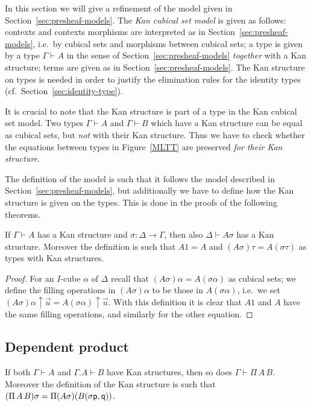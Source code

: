 \documentclass[10pt,a4paper]{article}
\newcommand{\pp}{{\sf p}}
\newcommand{\qq}{{\sf q}}
\newcommand{\rup}[1]{#1{\uparrow}}
\begin{document}
In this section we will give a refinement of the model given in
Section~\ref{sec:presheaf-models}.  The \emph{Kan cubical set model}
is given as follows: contexts and contexts morphisms are interpreted
as in Section~\ref{sec:presheaf-models}, i.e.\ by cubical sets and
morphisms between cubical sets; a type is given by a type $\Gamma
\vdash A$ in the sense of Section~\ref{sec:presheaf-models}
\emph{together} with a Kan structure; terms are given as in
Section~\ref{sec:presheaf-models}. The Kan structure on types is
needed in order to justify the elimination rules for the identity
types (cf.\ Section~\ref{sec:identity-type}).

It is crucial to note that the Kan structure is part of a type in the
Kan cubical set model.  Two types $\Gamma \vdash A$ and $\Gamma \vdash
B$ which have a Kan structure can be equal as cubical sets, but
\emph{not} with their Kan structure.  Thus we have to check whether
the equations between types in Figure~\ref{MLTT} are preserved
\emph{for their Kan structure}.

The definition of the model is such that it follows the model
described in Section~\ref{sec:presheaf-models}, but additionally we
have to define how the Kan structure is given on the types.  This is
done in the proofs of the following theorems.

\begin{theorem}
  If $\Gamma \vdash A$ has a Kan structure and $\sigma \colon \Delta
  \to \Gamma$, then also $\Delta \vdash A \sigma$ has a Kan structure.
  Moreover the definition is such that $A 1 = A$ and $(A \sigma) \tau
  = A (\sigma \tau)$ as types with Kan structures.
\end{theorem}
\begin{proof}
  For an $I$-cube $\alpha$ of $\Delta$ recall that $(A \sigma) \alpha
  = A (\sigma \alpha)$ as cubical sets; we define the filling
  operations in $(A \sigma) \alpha$ to be those in $A (\sigma
  \alpha)$, i.e.\ we set $\rup{(A \sigma) \alpha} {\vec u} = \rup {A
    (\sigma \alpha)} {\vec u}$.  With this definition it is clear that
  $A 1$ and $A$ have the same filling operations, and similarly for
  the other equation.
\end{proof}

\subsection{Dependent product}

\begin{theorem}
  If both $\Gamma\vdash A$ and $\Gamma.A\vdash B$ have Kan structures,
  then so does $\Gamma\vdash\Pi\,A\,B$.  Moreover the definition of
  the Kan structure is such that $(\Pi\,A\,B) \sigma = \Pi (A \sigma)
  (B (\sigma \pp, \qq))$.
\end{theorem}
\end{document}
